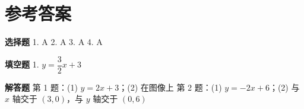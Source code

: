 \documentclass{exam-zh}
\begin{document}
\clearpage
\section*{参考答案}


\begin{keyideabox}
  \textbf{选择题}
  1. A  2. A  3. A  4. A
\end{keyideabox}



\begin{keyideabox}
  \textbf{填空题}
  1. $y = \dfrac{3}{2}x + 3$
\end{keyideabox}



\begin{keyideabox}
  \textbf{解答题}
  第 1 题：(1) $y = 2x + 3$；(2) 在图像上
第 2 题：(1) $y = -2x + 6$；(2) 与 $x$ 轴交于 $(3, 0)$，与 $y$ 轴交于 $(0, 6)$
\end{keyideabox}
\end{document}
